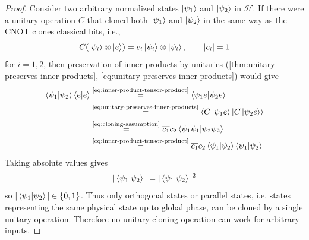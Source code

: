 \begin{proof}
Consider two arbitrary normalized states \(\ket{\psi_1}\) and \(\ket{\psi_2}\) in \(\mathcal{H}\).
If there were a unitary operation $C$ that cloned both \(\ket{\psi_1}\) and \(\ket{\psi_2}\) in the same way as the CNOT clones classical bits,
i.e.,
\begin{equation}\label{eq:cloning-assumption}
C(\ket{\psi_i}\otimes\ket{e})
=
c_i\ket{\psi_i}\otimes\ket{\psi_i},
\qquad |c_i|=1
\end{equation} 
for \(i=1,2\),
then preservation of inner products 
by unitaries (\autoref{thm:unitary-preserves-inner-products}, \autoref{eq:unitary-preserves-inner-products})
would give
\[
\begin{aligned}
  \braket{\psi_1|\psi_2}\braket{e|e}
  &\overset{\text{\eqref{eq:inner-product-tensor-product}}}{=}
  \braket{\psi_1 e|\psi_2 e} \\
  &\overset{\text{\eqref{eq:unitary-preserves-inner-products}}}{=}
  \braket{C\ket{\psi_1 e}|C\ket{\psi_2 e}} \\
  &\overset{\text{\eqref{eq:cloning-assumption}}}{=}
  \overline{c_1}c_2\braket{\psi_1 \psi_1|\psi_2 \psi_2} \\
  &\overset{\text{\eqref{eq:inner-product-tensor-product}}}{=}
  \overline{c_1}c_2\braket{\psi_1|\psi_2}\braket{\psi_1|\psi_2}
\end{aligned}
\]
Taking absolute values gives
\[
|\braket{\psi_1|\psi_2}|
=
|\braket{\psi_1|\psi_2}|^2
\]
so
\(
|\braket{\psi_1|\psi_2}|\in\{0,1\}
\).
Thus only orthogonal states or parallel states, i.e. states representing the same physical state up to global phase, can be cloned by a single unitary operation.
Therefore no unitary cloning operation can work for arbitrary inputs.
\end{proof}

